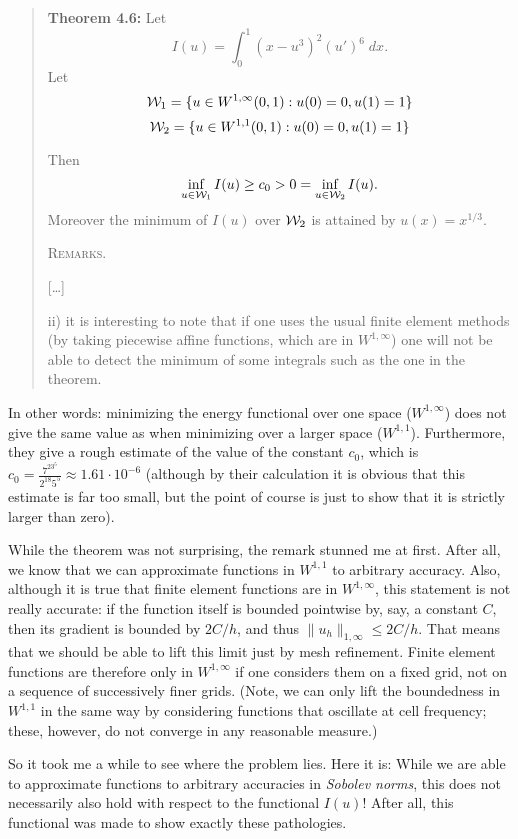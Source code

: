 \documentclass{article}
\begin{document}
\begin{quote}
  \textbf{Theorem 4.6:} Let 
  $$I(u)=\int_0^1 (x-u^3)^2 (u')^6\; dx.$$
  Let
  $$
    {\cal W}_1 = \{ u\in W^{1,\infty}(0,1) : u(0)=0, u(1)=1 \}
    $$ $$
    {\cal W}_2 = \{ u\in W^{1,1}(0,1) : u(0)=0, u(1)=1 \}
  $$

  Then
  $$
  \inf_{u\in {\cal W}_1} I(u) \ge c_0 > 0 = \inf_{u\in {\cal W}_2} I(u).
  $$
  Moreover the minimum of $I(u)$ over ${\cal W}_2$ is attained by
  $u(x)=x^{1/3}$. 

  \textsc{Remarks.}

  [\ldots]

  ii) it is interesting to note that if one uses the usual finite element
  methods (by taking piecewise affine functions, which are in $W^{1,\infty}$)
  one will not be able to detect the minimum of some integrals such as the one
  in the theorem.
\end{quote}
In other words: minimizing the energy functional over one space
($W^{1,\infty}$) does not give the same value as when minimizing over a larger
space ($W^{1,1}$). Furthermore, they give a rough estimate of the value of the
constant $c_0$, which is $c_0=\tfrac{7^23^5}{2^{18}5^5}\approx 1.61\cdot
10^{-6}$ (although by their calculation it is obvious that this estimate is
far too small, but the point of course is just to show that it is strictly
larger than zero).

While the theorem was not surprising, the remark stunned me at first. After
all, we know that we can approximate functions in $W^{1,1}$ to arbitrary
accuracy.  Also, although it is true that finite element functions are in
$W^{1,\infty}$, this statement is not really accurate: if the function itself
is bounded pointwise by, say, a constant $C$, then its gradient is bounded by
$2C/h$, and thus $\|u_h\|_{1,\infty} \le 2C/h$. That means that we should be
able to lift this limit just by mesh refinement. Finite element functions are
therefore only in $W^{1,\infty}$ if one considers them on a fixed grid, not on
a sequence of successively finer grids. (Note, we can only lift the
boundedness in $W^{1,1}$ in the same way by considering functions that
oscillate at cell frequency; these, however, do not converge in any reasonable
measure.)

So it took me a while to see where the problem lies. Here it is: While we are
able to approximate functions to arbitrary accuracies in \textit{Sobolev
  norms}, this does not necessarily also hold with respect to the functional
$I(u)$!  After all, this functional was made to show exactly these
pathologies.
\end{document}
